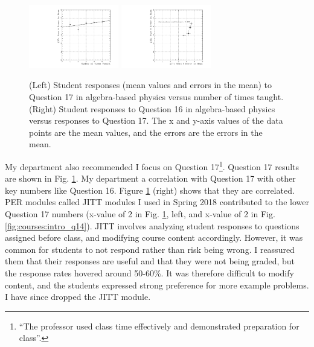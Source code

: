 \documentclass[../../main.tex]{subfiles}
\begin{document}
\begin{figure}[h]
\centering
\includegraphics[width=0.35\textwidth]{Q17_algebra_based.pdf}
\includegraphics[width=0.35\textwidth]{Q16_Q17_algebra_based.pdf}
\caption{\label{fig:courses:intro_q17}  (Left) Student responses (mean values and errors in the mean) to Question 17 in algebra-based physics versus number of times taught. (Right) Student responses to Question 16 in algebra-based physics versus responses to Question 17.  The x and y-axis values of the data points are the mean values, and the errors are the errors in the mean.}
\end{figure}

My department also recommended I focus on Question 17\footnote{``The professor used class time effectively and demonstrated preparation for class''.}.  Question 17 results are shown in Fig. \ref{fig:courses:intro_q17}.  My department a correlation with Question 17 with other key numbers like Question 16.  Figure \ref{fig:courses:intro_q17} (right) shows that they are correlated.  PER modules called JITT modules I used in Spring 2018 contributed to the lower Question 17 numbers (x-value of 2 in Fig. \ref{fig:courses:intro_q17}, left, and x-value of 2 in Fig. \ref{fig:courses:intro_q14}).  JITT involves analyzing student responses to questions assigned before class, and modifying course content accordingly.  However, it was common for students to not respond rather than risk being wrong.  I reassured them that their responses are useful and that they were not being graded, but the response rates hovered around 50-60\%.  It was therefore difficult to modify content, and the students expressed strong preference for more example problems.  I have since dropped the JITT module.  \\ \hspace{0.1cm}
\end{document}
